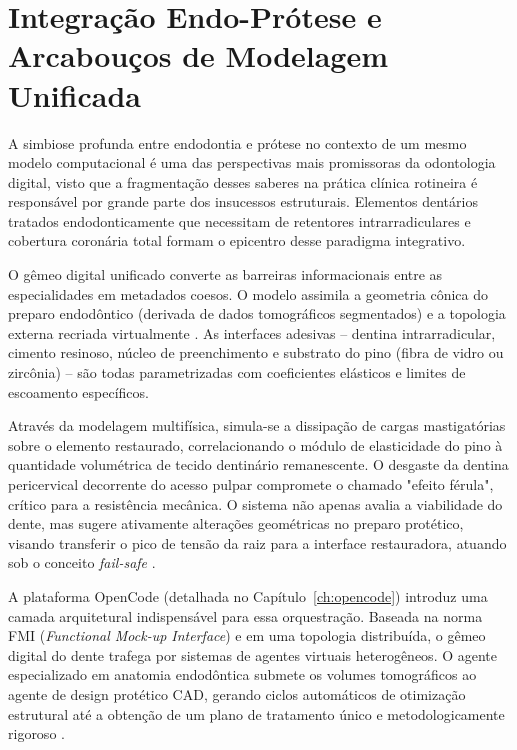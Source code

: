 \section{Integração Endo-Prótese e Arcabouços de Modelagem Unificada}

A simbiose profunda entre endodontia e prótese no contexto de um mesmo modelo computacional é uma das perspectivas mais promissoras da odontologia digital, visto que a fragmentação desses saberes na prática clínica rotineira é responsável por grande parte dos insucessos estruturais. Elementos dentários tratados endodonticamente que necessitam de retentores intrarradiculares e cobertura coronária total formam o epicentro desse paradigma integrativo.

O gêmeo digital unificado converte as barreiras informacionais entre as especialidades em metadados coesos. O modelo assimila a geometria cônica do preparo endodôntico (derivada de dados tomográficos segmentados) e a topologia externa recriada virtualmente \cite{alshadidi2024surface}. As interfaces adesivas -- dentina intrarradicular, cimento resinoso, núcleo de preenchimento e substrato do pino (fibra de vidro ou zircônia) -- são todas parametrizadas com coeficientes elásticos e limites de escoamento específicos.


Através da modelagem multifísica, simula-se a dissipação de cargas mastigatórias sobre o elemento restaurado, correlacionando o módulo de elasticidade do pino à quantidade volumétrica de tecido dentinário remanescente. O desgaste da dentina pericervical decorrente do acesso pulpar compromete o chamado "efeito férula", crítico para a resistência mecânica. O sistema não apenas avalia a viabilidade do dente, mas sugere ativamente alterações geométricas no preparo protético, visando transferir o pico de tensão da raiz para a interface restauradora, atuando sob o conceito \textit{fail-safe} \cite{xing2024clinical}.

A plataforma OpenCode (detalhada no Capítulo~\ref{ch:opencode}) introduz uma camada arquitetural indispensável para essa orquestração. Baseada na norma FMI (\textit{Functional Mock-up Interface}) e em uma topologia distribuída, o gêmeo digital do dente trafega por sistemas de agentes virtuais heterogêneos. O agente especializado em anatomia endodôntica submete os volumes tomográficos ao agente de design protético CAD, gerando ciclos automáticos de otimização estrutural até a obtenção de um plano de tratamento único e metodologicamente rigoroso \cite{robles2023opentwins}.
